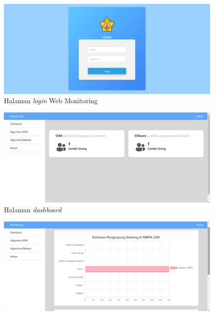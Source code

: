 \begin{enumerate}[a.]
	      \vspace{-0cm}
	      \begin{figure}[H]
		      \center
		      \includegraphics [width = 13.5 cm, height= 6.75 cm]{gambar/web/Login}
		      \caption{Halaman \textit{login} Web Monitoring}
		      \label{LoginWeb}
	      \end{figure}
	      \begin{figure}[H]
		      \center
		      \includegraphics [width = 13.5 cm, height= 6.75 cm]{gambar/web/Dashbord}
		      \caption{Halaman \textit{dashboard}}
		      \label{Dashbord}
	      \end{figure}
	      \begin{figure}[H]
		      \center
		      \includegraphics [width = 13.5 cm, height= 6.75 cm]{gambar/web/Estimasi_Grafik}

\end{figure}
\end{enumerate}
